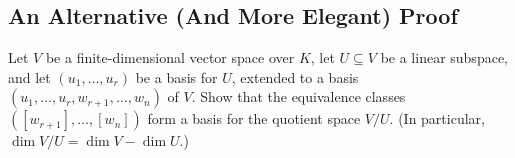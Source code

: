 \subsection{An Alternative (And More Elegant) Proof}

\begin{exercise}\label{ex:quotient_basis}
  Let $V$ be a finite-di\-men\-sional vector space over $K$, let $U \subseteq V$ be a linear subspace, and let $(u_1, \dots, u_r)$ be a basis for $U$, extended to a basis $(u_1, \dots, u_r, w_{r+1}, \dots, w_n)$ of $V$. Show that the equivalence classes $([w_{r+1}], \dots, [w_n])$ form a basis for the quotient space $V/U$. (In particular, $\dim V/U = \dim V - \dim U$.)
\end{exercise}

